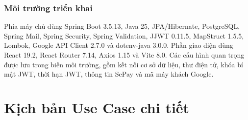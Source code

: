 ﻿\documentclass[12pt,a4paper]{report}
\begin{document}
\subsection{Môi trường triển khai}
Phía máy chủ dùng Spring Boot 3.5.13, Java 25, JPA/Hibernate, PostgreSQL, Spring Mail, Spring Security, Spring Validation, JJWT 0.11.5, MapStruct 1.5.5, Lombok, Google API Client 2.7.0 và dotenv-java 3.0.0. Phần giao diện dùng React 19.2, React Router 7.14, Axios 1.15 và Vite 8.0. Các cấu hình quan trọng được lưu trong biến môi trường, gồm kết nối cơ sở dữ liệu, thư điện tử, khóa bí mật JWT, thời hạn JWT, thông tin SePay và mã máy khách Google.

\chapter{Kịch bản Use Case chi tiết}
\end{document}
